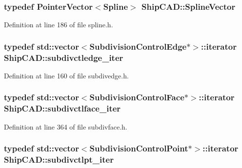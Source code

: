 \subsubsection[{\texorpdfstring{Spline\+Vector}{SplineVector}}]{\setlength{\rightskip}{0pt plus 5cm}typedef {\bf Pointer\+Vector}$<${\bf Spline}$>$ {\bf Ship\+C\+A\+D\+::\+Spline\+Vector}}\hypertarget{namespaceShipCAD_a053b941b2c87049bb9380428d4d5a056}{}\label{namespaceShipCAD_a053b941b2c87049bb9380428d4d5a056}


Definition at line 186 of file spline.\+h.

\subsubsection[{\texorpdfstring{subdivctledge\+\_\+iter}{subdivctledge_iter}}]{\setlength{\rightskip}{0pt plus 5cm}typedef std\+::vector$<${\bf Subdivision\+Control\+Edge}$\ast$$>$\+::iterator {\bf Ship\+C\+A\+D\+::subdivctledge\+\_\+iter}}\hypertarget{namespaceShipCAD_a622b92c46380228698ff1e0e1d78aa3a}{}\label{namespaceShipCAD_a622b92c46380228698ff1e0e1d78aa3a}


Definition at line 160 of file subdivedge.\+h.

\subsubsection[{\texorpdfstring{subdivctlface\+\_\+iter}{subdivctlface_iter}}]{\setlength{\rightskip}{0pt plus 5cm}typedef std\+::vector$<${\bf Subdivision\+Control\+Face}$\ast$$>$\+::iterator {\bf Ship\+C\+A\+D\+::subdivctlface\+\_\+iter}}\hypertarget{namespaceShipCAD_a10428817114540e55d0c0b8668cb2579}{}\label{namespaceShipCAD_a10428817114540e55d0c0b8668cb2579}


Definition at line 364 of file subdivface.\+h.

\subsubsection[{\texorpdfstring{subdivctlpt\+\_\+iter}{subdivctlpt_iter}}]{\setlength{\rightskip}{0pt plus 5cm}typedef std\+::vector$<${\bf Subdivision\+Control\+Point}$\ast$$>$\+::iterator {\bf Ship\+C\+A\+D\+::subdivctlpt\+\_\+iter}}\hypertarget{namespaceShipCAD_ae33d2f365316a630ce7c1eb7a889e36a}{}\label{namespaceShipCAD_ae33d2f365316a630ce7c1eb7a889e36a}


